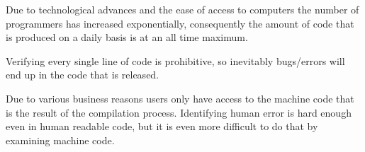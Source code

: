 Due to technological advances and the ease of access to computers the number
of programmers has increased exponentially, consequently the amount of code
that is produced on a daily basis is at an all time maximum.

Verifying every single line of code is prohibitive, so inevitably bugs/errors
will end up in the code that is released.

Due to various business reasons users only have access to the machine code that
is the result of the compilation process. Identifying human error is hard
enough even in human readable code, but it is even more difficult to do that
by examining machine code.

